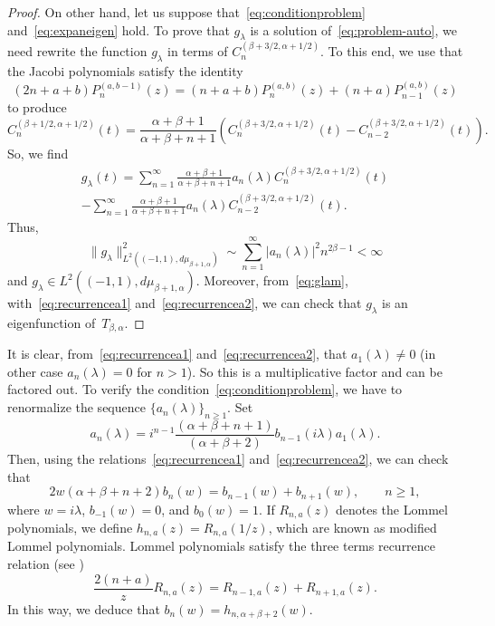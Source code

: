 \documentclass[12pt,a4paper]{amsart}
\theoremstyle{plain}
\theoremstyle{definition}
\begin{document}
\begin{proof}
On other hand, let us suppose that~\eqref{eq:conditionproblem} 
and~\eqref{eq:expaneigen} hold. To prove that $g_\lambda$ is a
solution of~\eqref{eq:problem-auto}, we need rewrite the function
$g_{\lambda}$ in terms of $C_n^{(\beta+3/2,\alpha+1/2)}$. To this
end, we use that the Jacobi polynomials satisfy the identity
\cite[formula 22.7.19, p.~782]{AbSt}
\[
  (2n+a+b)P_n^{(a,b-1)}(z) = (n+a+b)P_n^{(a,b)}(z) + (n+a)P_{n-1}^{(a,b)}(z)
\]
to produce
\[
  C_n^{(\beta+1/2,\alpha+1/2)}(t)
  = \frac{\alpha+\beta+1}{\alpha+\beta+n+1}
  (C_n^{(\beta+3/2,\alpha+1/2)}(t) - C_{n-2}^{(\beta+3/2,\alpha+1/2)}(t)).
\]
So, we find
\begin{multline}
\label{eq:glam}
  g_{\lambda}(t) = \sum_{n=1}^\infty
  \frac{\alpha+\beta+1}{\alpha+\beta+n+1}a_{n}(\lambda)
  C_n^{(\beta+3/2,\alpha+1/2)}(t) \\
  - \sum_{n=1}^\infty
  \frac{\alpha+\beta+1}{\alpha+\beta+n+1}a_{n}(\lambda)
  C_{n-2}^{(\beta+3/2,\alpha+1/2)}(t).
\end{multline}
Thus,
\[
  \|g_\lambda\|^2_{L^2((-1,1),d\mu_{\beta+1,\alpha})}
  \sim \sum_{n=1}^\infty |a_{n}(\lambda)|^2 n^{2\beta-1} < \infty
\]
and $g_\lambda \in L^2((-1,1),d\mu_{\beta+1,\alpha})$. Moreover,
from~\eqref{eq:glam}, with~\eqref{eq:recurrencea1} and~\eqref{eq:recurrencea2}, 
we can check that $g_\lambda$ is an eigenfunction of~$T_{\beta,\alpha}$.
\end{proof}

It is clear, from~\eqref{eq:recurrencea1} and~\eqref{eq:recurrencea2}, 
that $a_1(\lambda)\not=0$ (in other case $a_n(\lambda)=0$ for $n>1$). 
So this is a multiplicative factor and can be factored out. To verify the 
condition~\eqref{eq:conditionproblem}, we have to renormalize the sequence
$\{a_n(\lambda)\}_{n\ge 1}$. Set
\begin{equation}
\label{eq:relationab}
  a_n(\lambda) = i^{n-1}
  \frac{(\alpha+\beta+n+1)}{(\alpha+\beta+2)}b_{n-1}(i\lambda)a_1(\lambda).
\end{equation}
Then, using the relations~\eqref{eq:recurrencea1} and~\eqref{eq:recurrencea2}, 
we can check that
\begin{equation}
\label{eq:recurrenceb}
  2w (\alpha+\beta+n+2)b_n(w) = b_{n-1}(w)+b_{n+1}(w),
  \qquad n\ge 1,
\end{equation}
where $w=i\lambda$, $b_{-1}(w)=0$, and $b_0(w)=1$. If $R_{n,a}(z)$
denotes the Lommel polynomials, we define
$h_{n,a}(z) = R_{n,a}(1/z)$, which are known as modified Lommel
polynomials. Lommel polynomials satisfy the three terms recurrence
relation (see \cite[\S\,9.63, formula~(2), p.~299]{Wat})
\[
  \frac{2(n+a)}{z}R_{n,a}(z) = R_{n-1,a}(z)+R_{n+1,a}(z).
\]
In this way, we deduce that $b_n(w) = h_{n,\alpha+\beta+2}(w)$.
\end{document}
